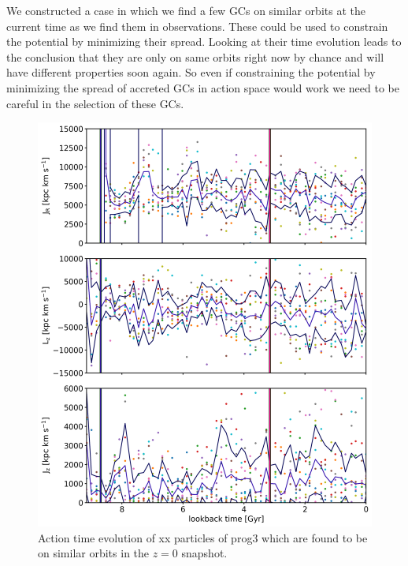 We constructed a case in which we find a few \acp{GC} on similar orbits at the current time as we find them in observations. These could be used to constrain the potential by minimizing their spread. Looking at their time evolution leads to the conclusion that they are only on same orbits right now by chance and will have different properties soon again. So even if constraining the potential by minimizing the spread of accreted \acp{GC} in action space would work we need to be careful in the selection of these \acp{GC}.
\iffalse
\begin{figure}
\captionsetup{format=plain}
    \centering
	\includegraphics[width=\textwidth]{plots/Dynamics/prog3/action_time_evolution_box_hist_mean_prog3.png}
    \caption{Action time evolution of xx particles of prog3 which are found to be on similar orbits in the $z=0$ snapshot.}\label{fig:actions_box_time_evolution_prog3}
\end{figure}

